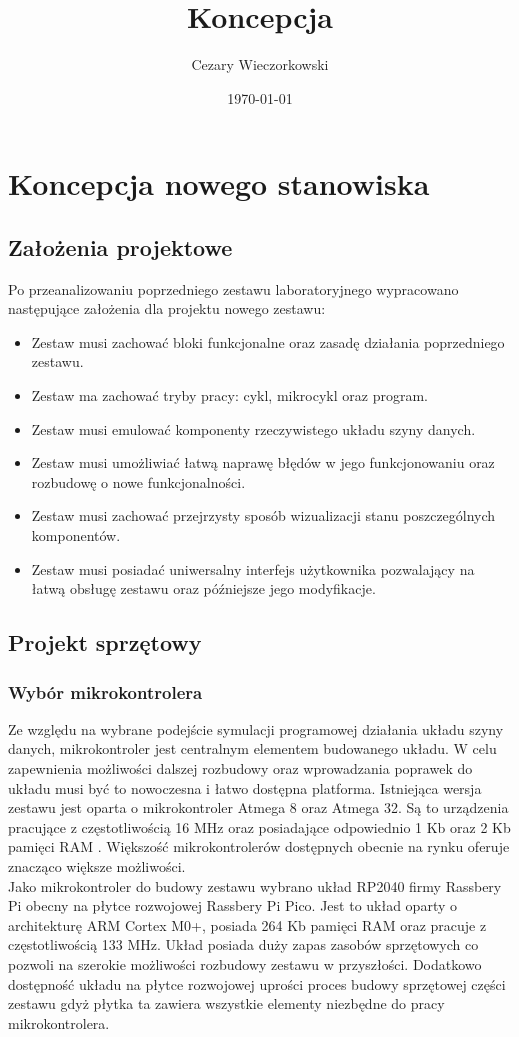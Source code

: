 \documentclass[../main.tex]{subfiles}
\author{Cezary Wieczorkowski}
\date{\today}
\title{Koncepcja}
\begin{document}
\section{Koncepcja nowego stanowiska}

\subsection{Założenia projektowe}

    Po przeanalizowaniu poprzedniego zestawu laboratoryjnego wypracowano następujące założenia dla projektu nowego zestawu:
    \begin{itemize}
    \item Zestaw musi zachować bloki funkcjonalne oraz zasadę działania poprzedniego zestawu.
    \item Zestaw ma zachować tryby pracy: cykl, mikrocykl oraz program.
    \item Zestaw musi emulować komponenty rzeczywistego układu szyny danych.
    \item Zestaw musi umożliwiać łatwą naprawę błędów w jego funkcjonowaniu oraz rozbudowę o nowe funkcjonalności.
    \item Zestaw musi zachować przejrzysty sposób wizualizacji stanu poszczególnych komponentów.
    \item Zestaw musi posiadać uniwersalny interfejs użytkownika pozwalający na łatwą obsługę zestawu oraz późniejsze jego modyfikacje.
    \end{itemize}

\subsection{Projekt sprzętowy}

    \subsubsection{Wybór mikrokontrolera}

    Ze względu na wybrane podejście symulacji programowej działania układu szyny danych, mikrokontroler jest centralnym elementem budowanego układu.
    W celu zapewnienia możliwości dalszej rozbudowy oraz wprowadzania poprawek do układu musi być to nowoczesna i łatwo dostępna platforma. 
    Istniejąca wersja zestawu jest oparta o mikrokontroler Atmega 8 oraz Atmega 32. Są to urządzenia pracujące z częstotliwością 16 MHz oraz 
    posiadające odpowiednio 1 Kb oraz 2 Kb pamięci RAM \cite{at:atmega8} \cite{at:atmega32}. Większość mikrokontrolerów dostępnych obecnie na 
    rynku oferuje znacząco większe możliwości. 
    \\
    Jako mikrokontroler do budowy zestawu wybrano układ RP2040 firmy Rassbery Pi \cite{rp:rp2040} obecny na płytce rozwojowej Rassbery Pi Pico. 
    Jest to układ oparty o architekturę ARM Cortex M0+, posiada 264 Kb pamięci RAM oraz pracuje z częstotliwością 133 MHz. Układ posiada duży zapas
    zasobów sprzętowych co pozwoli na szerokie możliwości rozbudowy zestawu w przyszłości. Dodatkowo dostępność układu na płytce rozwojowej uprości
    proces budowy sprzętowej części zestawu gdyż płytka ta zawiera wszystkie elementy niezbędne do pracy mikrokontrolera.
\end{document}
